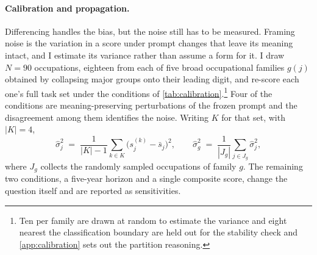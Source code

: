 \paragraph{Calibration and propagation.} Differencing handles the bias, but the noise still has to be measured. Framing noise is the variation in a score under prompt changes that leave its meaning intact, and I estimate its variance rather than assume a form for it. I draw $N=90$ occupations, eighteen from each of five broad occupational families $g(j)$ obtained by collapsing major groups onto their leading digit, and re-score each one's full task set under the conditions of \cref{tab:calibration}.\footnote{Ten per family are drawn at random to estimate the variance and eight nearest the classification boundary are held out for the stability check and \cref{app:calibration} sets out the partition reasoning.} Four of the conditions are meaning-preserving perturbations of the frozen prompt and the disagreement among them identifies the noise. Writing $K$ for that set, with $|K| = 4$,
\begin{equation}\label{eq:variance}
\widehat{\sigma}^2_j \;=\;
\frac{1}{|K| - 1} \sum_{k \in K}
\bigl(s^{(k)}_j - \bar{s}_j\bigr)^2,
\qquad
\widehat{\sigma}^2_g \;=\;
\frac{1}{|J_g|} \sum_{j \in J_g} \widehat{\sigma}^2_j ,
\end{equation}
where $J_g$ collects the randomly sampled occupations of family $g$. The remaining two conditions, a five-year horizon and a single composite score, change the question itself and are reported as sensitivities.

